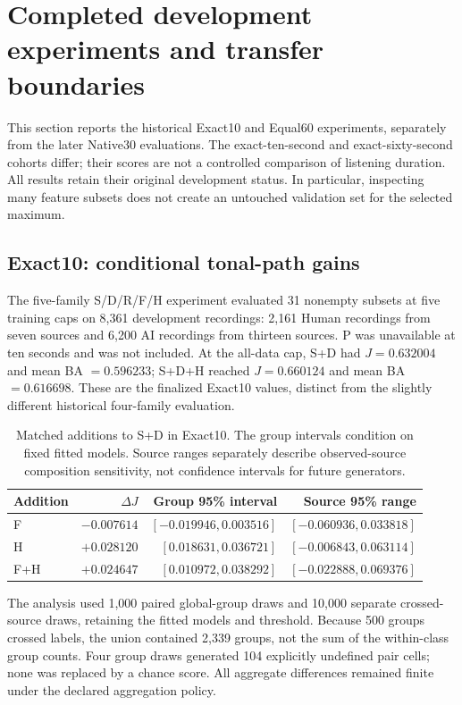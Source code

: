\section{Completed development experiments and transfer boundaries}
\label{sec:completed-transfer-results}

This section reports the historical Exact10 and Equal60 experiments, separately from the later Native30 evaluations.
The exact-ten-second and exact-sixty-second cohorts differ; their scores are
not a controlled comparison of listening duration. All results retain their
original development status. In particular, inspecting many feature subsets
does not create an untouched validation set for the selected maximum.

\subsection{Exact10: conditional tonal-path gains}

The five-family S/D/R/F/H experiment evaluated 31 nonempty subsets at five
training caps on 8,361 development recordings: 2,161 Human recordings from
seven sources and 6,200 AI recordings from thirteen sources. P was unavailable
at ten seconds and was not included. At the all-data cap, S+D had
$J=0.632004$ and mean BA $=0.596233$; S+D+H reached $J=0.660124$ and mean
BA $=0.616698$. These are the finalized Exact10 values, distinct from the
slightly different historical four-family evaluation.

\begin{table}[htbp]
\centering\small
\caption{Matched additions to S+D in Exact10. The group intervals condition on
fixed fitted models. Source ranges separately describe observed-source
composition sensitivity, not confidence intervals for future generators.}
\label{tab:exact10-conditional}
\begin{tabular}{lrrr}
\toprule
Addition & $\Delta J$ & Group 95\% interval & Source 95\% range\\
\midrule
F & $-0.007614$ & $[-0.019946,0.003516]$ & $[-0.060936,0.033818]$\\
H & $+0.028120$ & $[0.018631,0.036721]$ & $[-0.006843,0.063114]$\\
F+H & $+0.024647$ & $[0.010972,0.038292]$ & $[-0.022888,0.069376]$\\
\bottomrule
\end{tabular}
\end{table}

The analysis used 1,000 paired global-group draws and 10,000 separate
crossed-source draws, retaining the fitted models and threshold. Because 500
groups crossed labels, the union contained 2,339 groups, not the sum of the
within-class group counts. Four group draws generated 104 explicitly undefined
pair cells; none was replaced by a chance score. All aggregate differences
remained finite under the declared aggregation policy.

